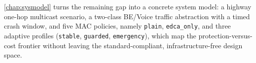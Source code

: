 \autoref{chap:sysmodel} turns the remaining gap into a concrete system model: a highway one-hop multicast scenario, a two-class BE/Voice traffic abstraction with a timed crash window, and five MAC policies, namely \texttt{plain}, \texttt{edca\_only}, and three adaptive profiles (\texttt{stable}, \texttt{guarded}, \texttt{emergency}), which map the protection-versus-cost frontier without leaving the standard-compliant, infrastructure-free design space.
